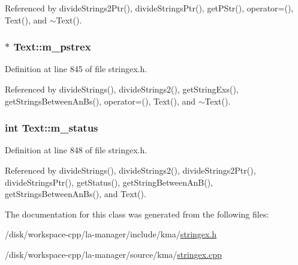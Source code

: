 Referenced by divideStrings2Ptr(), divideStringsPtr(), getPStr(), operator=(), Text(), and $\sim$Text().\hypertarget{classText_8f53b73678399a3d4614178d26ae20e5}{
\subsubsection[{m\_\-pstrex}]{$\ast$ {\bf Text::m\_\-pstrex}}}
\label{classText_8f53b73678399a3d4614178d26ae20e5}




Definition at line 845 of file stringex.h.

Referenced by divideStrings(), divideStrings2(), getStringExs(), getStringsBetweenAnBs(), operator=(), Text(), and $\sim$Text().\hypertarget{classText_24ca99bcb2250e922ce3e85cdda5e9df}{
\subsubsection[{m\_\-status}]{\setlength{\rightskip}{0pt plus 5cm}int {\bf Text::m\_\-status}}}
\label{classText_24ca99bcb2250e922ce3e85cdda5e9df}




Definition at line 848 of file stringex.h.

Referenced by divideStrings(), divideStrings2(), divideStrings2Ptr(), divideStringsPtr(), getStatus(), getStringBetweenAnB(), getStringsBetweenAnBs(), and Text().

The documentation for this class was generated from the following files:\begin{CompactItemize}
\item 
/disk/workspace-cpp/la-manager/include/kma/\hyperlink{stringex_8h}{stringex.h}\item 
/disk/workspace-cpp/la-manager/source/kma/\hyperlink{stringex_8cpp}{stringex.cpp}\end{CompactItemize}
